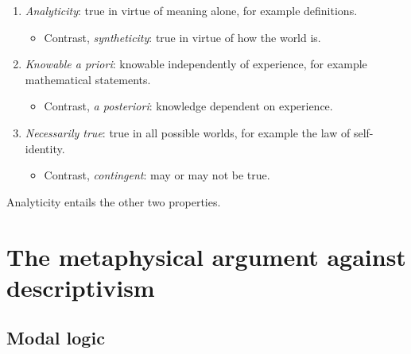 \begin{definition}\leavevmode
\begin{enumerate}[label=\roman*.]
  \item \emph{Analyticity}: true in virtue of meaning alone, for example definitions.
  \begin{itemize}
    \item Contrast, \emph{syntheticity}: true in virtue of how the world is.
  \end{itemize}
  \item \emph{Knowable a priori}: knowable independently of experience, for example mathematical statements.
  \begin{itemize}
    \item Contrast, \emph{a posteriori}: knowledge dependent on experience.
  \end{itemize}
  \item \emph{Necessarily true}: true in all possible worlds, for example the law of self-identity.
  \begin{itemize}
    \item Contrast, \emph{contingent}: may or may not be true.
  \end{itemize}
\end{enumerate}
\end{definition}

\begin{note}
Analyticity entails the other two properties.
\end{note}

\section{The metaphysical argument against descriptivism}

\subsection{Modal logic}

